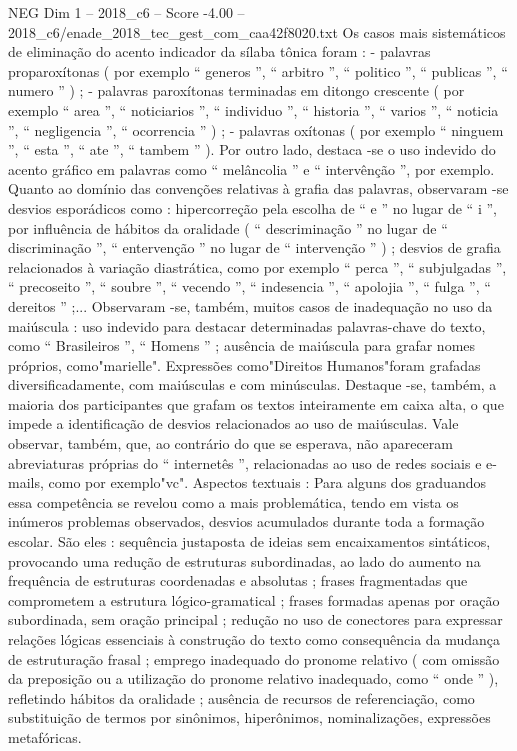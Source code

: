 \begin{textsample}{NEG Dim 1 – 2018\_c6 – Score -4.00 – 2018\_c6/enade\_2018\_tec\_gest\_com\_caa42f8020.txt}
Os casos mais sistemáticos de eliminação do acento indicador da sílaba tônica foram : - palavras proparoxítonas ( por exemplo “ generos ”, “ arbitro ”, “ politico ”, “ publicas ”, “ numero ” ) ; - palavras paroxítonas terminadas em ditongo crescente ( por exemplo “ area ”, “ noticiarios ”, “ individuo ”, “ historia ”, “ varios ”, “ noticia ”, “ negligencia ”, “ ocorrencia ” ) ; - palavras oxítonas ( por exemplo “ ninguem ”, “ esta ”, “ ate ”, “ tambem ” ).
Por outro lado, destaca -se o uso indevido do acento gráfico em palavras como “ melâncolia ” e “ intervênção ”, por exemplo.
Quanto ao domínio das convenções relativas à grafia das palavras, observaram -se desvios esporádicos como : hipercorreção pela escolha de “ e ” no lugar de “ i ”, por influência de hábitos da oralidade ( “ descriminação ” no lugar de “ discriminação ”, “ entervenção ” no lugar de “ intervenção ” ) ; desvios de grafia relacionados à variação diastrática, como por exemplo “ perca ”, “ subjulgadas ”, “ precoseito ”, “ soubre ”, “ vecendo ”, “ indesencia ”, “ apolojia ”, “ fulga ”, “ dereitos ” ;...
Observaram -se, também, muitos casos de inadequação no uso da maiúscula : uso indevido para destacar determinadas palavras-chave do texto, como “ Brasileiros ”, “ Homens ” ; ausência de maiúscula para grafar nomes próprios, como"marielle".
Expressões como"Direitos Humanos"foram grafadas diversificadamente, com maiúsculas e com minúsculas.
Destaque -se, também, a maioria dos participantes que grafam os textos inteiramente em caixa alta, o que impede a identificação de desvios relacionados ao uso de maiúsculas.
Vale observar, também, que, ao contrário do que se esperava, não apareceram abreviaturas próprias do “ internetês ”, relacionadas ao uso de redes sociais e e-mails, como por exemplo"vc".
Aspectos textuais : Para alguns dos graduandos essa competência se revelou como a mais problemática, tendo em vista os inúmeros problemas observados, desvios acumulados durante toda a formação escolar.
São eles : sequência justaposta de ideias sem encaixamentos sintáticos, provocando uma redução de estruturas subordinadas, ao lado do aumento na frequência de estruturas coordenadas e absolutas ; frases fragmentadas que comprometem a estrutura lógico-gramatical ; frases formadas apenas por oração subordinada, sem oração principal ; redução no uso de conectores para expressar relações lógicas essenciais à construção do texto como consequência da mudança de estruturação frasal ; emprego inadequado do pronome relativo ( com omissão da preposição ou a utilização do pronome relativo inadequado, como “ onde ” ), refletindo hábitos da oralidade ; ausência de recursos de referenciação, como substituição de termos por sinônimos, hiperônimos, nominalizações, expressões metafóricas.

\end{textsample}
